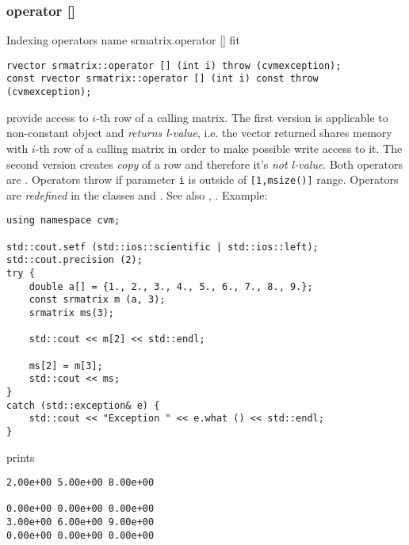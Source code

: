 \subsubsection{operator []}
Indexing operators%
\pdfdest name {srmatrix.operator []} fit
\begin{verbatim}
rvector srmatrix::operator [] (int i) throw (cvmexception);
const rvector srmatrix::operator [] (int i) const throw (cvmexception);
\end{verbatim}
provide access to \hbox{$i$-th} row of a calling matrix. The first version
is applicable to non-constant object and
\emph{returns  l-value}, i.e. the vector returned shares  memory
with \hbox{$i$-th} row of a calling matrix
in order to make possible write access to it.
The second version creates  \emph{copy} of a row and therefore it's
\emph{not  l-value}.
Both operators are \Based.
Operators throw 
if  parameter \verb"i" is outside of \verb"[1,msize()]" range.
Operators are \emph{redefined}
in the classes 
and .
See also ,
.
Example:
\begin{Verbatim}
using namespace cvm;

std::cout.setf (std::ios::scientific | std::ios::left); 
std::cout.precision (2);
try {
    double a[] = {1., 2., 3., 4., 5., 6., 7., 8., 9.};
    const srmatrix m (a, 3);
    srmatrix ms(3);

    std::cout << m[2] << std::endl;

    ms[2] = m[3];
    std::cout << ms;
}
catch (std::exception& e) {
    std::cout << "Exception " << e.what () << std::endl;
}
\end{Verbatim}
prints
\begin{Verbatim}
2.00e+00 5.00e+00 8.00e+00

0.00e+00 0.00e+00 0.00e+00
3.00e+00 6.00e+00 9.00e+00
0.00e+00 0.00e+00 0.00e+00
\end{Verbatim}
\newpage



